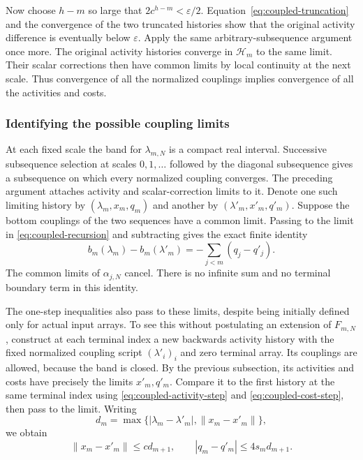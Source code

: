 Now choose $h-m$ so large that $2c^{h-m}<\varepsilon/2$.
Equation~\eqref{eq:coupled-truncation} and the convergence of
the two truncated histories show that the original activity
difference is eventually below $\varepsilon$. Apply the same
arbitrary-subsequence argument once more. The original activity
histories converge in $\mathcal H_m$ to the same limit. Their
scalar corrections then have common limits by local continuity
at the next scale. Thus convergence of all the normalized
couplings implies convergence of all the activities and costs.

\subsubsection{Identifying the possible coupling limits}
At each fixed scale the band for $\lambda_{m,N}$ is a compact
real interval. Successive subsequence selection at scales
$0,1,\ldots$ followed by the diagonal subsequence gives a
subsequence on which every normalized coupling converges.
The preceding argument attaches activity and scalar-correction
limits to it. Denote one such limiting history by
$(\lambda_m,x_m,q_m)$ and another by
$(\lambda'_m,x'_m,q'_m)$. Suppose the bottom couplings of the
two sequences have a common limit. Passing to the limit in
\eqref{eq:coupled-recursion} and subtracting gives the exact
finite identity
\begin{equation}\label{eq:coupled-telescope}
 b_m(\lambda_m)-b_m(\lambda'_m)
                  =-\sum_{j<m}(q_j-q'_j).
\end{equation}
The common limits of $\alpha_{j,N}$ cancel. There is no infinite
sum and no terminal boundary term in this identity.

The one-step inequalities also pass to these limits, despite
being initially defined only for actual input arrays. To see
this without postulating an extension of $F_{m,N}$, construct
at each terminal index a new backwards activity history with
the fixed normalized coupling script $(\lambda'_i)_i$ and zero
terminal array. Its couplings are allowed, because the band is
closed. By the previous subsection, its activities and costs
have precisely the limits $x'_m,q'_m$. Compare it to the first
history at the same terminal index using
\eqref{eq:coupled-activity-step} and
\eqref{eq:coupled-cost-step}, then pass to the limit. Writing
\[
       d_m=\max\{|\lambda_m-\lambda'_m|,\|x_m-x'_m\|\},
\]
we obtain
\begin{equation}\label{eq:coupled-limit-comparison}
 \|x_m-x'_m\|\le c d_{m+1},\qquad
                         |q_m-q'_m|\le4s_m d_{m+1}.
\end{equation}

